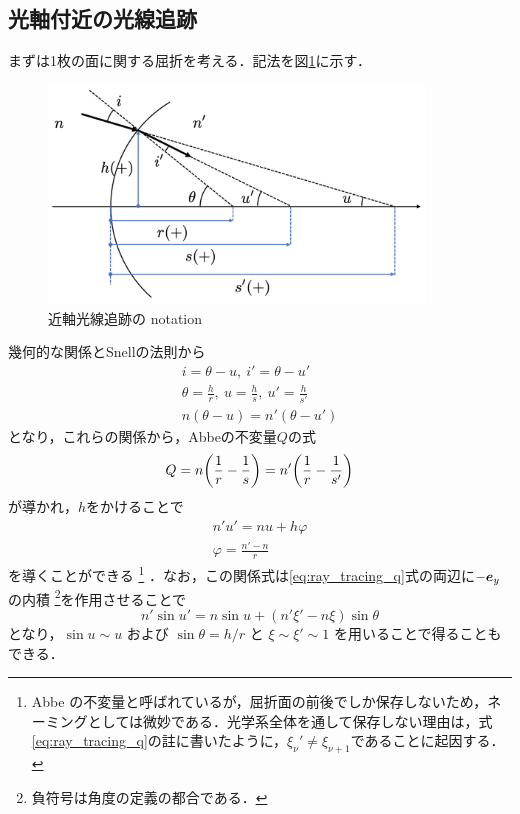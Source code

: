 \documentclass{jsarticle}
\begin{document}
\subsection{光軸付近の光線追跡}
\label{subsec:optical_axis_paraxial_tracing}
まずは1枚の面に関する屈折を考える．記法を図\ref{fig:paraxial_tracing}に示す．
\begin{figure}[b]
    \centering
    \includegraphics[width=10cm]{paraxial_tracing.png}
    \caption{近軸光線追跡の notation}
    \label{fig:paraxial_tracing}
\end{figure}
幾何的な関係とSnellの法則から
\begin{gather}
    i=\theta-u,\ i'=\theta-u'\\
    \theta=\frac{h}{r},\ u=\frac{h}{s},\ u'=\frac{h}{s'}\\
    n(\theta-u)=n'(\theta-u')
\end{gather}
となり，これらの関係から，Abbeの不変量$Q$の式
\begin{equation}
    Q=n\qty(\frac{1}{r}-\frac{1}{s})=n'\qty(\frac{1}{r}-\frac{1}{s'})
\end{equation}
が導かれ，$h$をかけることで
\begin{gather}
    n'u'=nu+h\varphi\\
    \varphi=\frac{n'-n}{r}
\end{gather}
を導くことができる
\footnote{
    Abbe の不変量と呼ばれているが，屈折面の前後でしか保存しないため，ネーミングとしては微妙である．光学系全体を通して保存しない理由は，式\eqref{eq:ray_tracing_q}の註に書いたように，$\xi_\nu' \neq\xi_{\nu+1}$であることに起因する．
}
．なお，この関係式は\eqref{eq:ray_tracing_q}式の両辺に$-\vb*{e}_y$の内積
\footnote{
    負符号は角度の定義の都合である．
}を作用させることで
\begin{equation}
    n'\sin u'=n\sin u+(n'\xi'-n\xi)\sin\theta
\end{equation}
となり，$\sin u\sim u$ および $\sin\theta=h/r$ と $\xi\sim\xi'\sim 1$ を用いることで得ることもできる．
\end{document}
